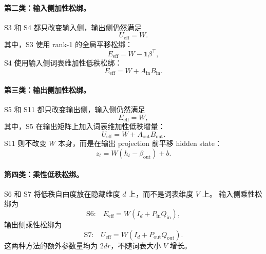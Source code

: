 \paragraph{第二类：输入侧加性松绑。}
S3 和 S4 都只改变输入侧，输出侧仍然满足
\begin{equation}
    U_{\mathrm{eff}} = W.
\end{equation}
其中，S3 使用 rank-1 的全局平移松绑：
\begin{equation}
    E_{\mathrm{eff}} = W-\mathbf{1}\beta^\top,
\end{equation}
S4 使用输入侧词表维加性低秩松绑：
\begin{equation}
    E_{\mathrm{eff}} = W+A_{\mathrm{in}}B_{\mathrm{in}}.
\end{equation}

\paragraph{第三类：输出侧加性松绑。}
S5 和 S11 都只改变输出侧，输入侧仍然满足
\begin{equation}
    E_{\mathrm{eff}} = W,
\end{equation}
其中，S5 在输出矩阵上加入词表维加性低秩增量：
\begin{equation}
    U_{\mathrm{eff}} = W+A_{\mathrm{out}}B_{\mathrm{out}}.
\end{equation}
S11 则不改变 $W$ 本身，而是在输出 projection 前平移 hidden state：
\begin{equation}
    z_t = W(h_t-\beta_{\mathrm{out}})+b.
\end{equation}

\paragraph{第四类：乘性低秩松绑。}
S6 和 S7 将低秩自由度放在隐藏维度 $d$ 上，而不是词表维度 $V$ 上。
输入侧乘性松绑为
\begin{equation}
    \text{S6:}\quad
    E_{\mathrm{eff}} = W(I_d+P_{\mathrm{in}}Q_{\mathrm{in}}),
\end{equation}
输出侧乘性松绑为
\begin{equation}
    \text{S7:}\quad
    U_{\mathrm{eff}} = W(I_d+P_{\mathrm{out}}Q_{\mathrm{out}}).
\end{equation}
这两种方法的额外参数量均为 $2dr$，不随词表大小 $V$ 增长。

